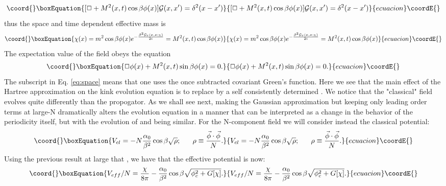 \documentclass[a4paper,prd,preprint,superscriptaddress,showpacs,byrevtex]{revtex4}
\begin{document}
\begin{equation}\coord{}\boxEquation{
[\Box + M^2(x,t) \cos \beta \phi(x)] {\cal G}(x,x') = \delta^2 (x-x')
}{
[\Box + M^2(x,t) \cos \beta \phi(x)] {\cal G}(x,x') = \delta^2 (x-x')
}{ecuacion}\coordE{}\end{equation} thus the space and time dependent effective mass is
\begin{equation}\coord{}\boxEquation{
\chi(x) = m^2 \cos \beta \phi(x) e^{-\frac{\beta^2 {\cal G}_r(x,x;\chi)}{2i}} = M^2
(x,t) \cos \beta \phi(x) \label{eq:space}}{
\chi(x) = m^2 \cos \beta \phi(x) e^{-\frac{\beta^2 {\cal G}_r(x,x;\chi)}{2i}} = M^2
(x,t) \cos \beta \phi(x) }{ecuacion}\coordE{}\end{equation}
The expectation value of the field obeys the equation
\begin{equation}\coord{}\boxEquation{
\Box \phi(x)  + M^2(x,t) \sin \beta \phi(x)       =0.
}{
\Box \phi(x)  + M^2(x,t) \sin \beta \phi(x)       =0.
}{ecuacion}\coordE{}\end{equation}
The subscript \coordHE{} in Eq. \ref{eq:space} means that one uses the once
subtracted covariant Green's function. Here we see that the main effect of the Hartree approximation on the
kink evolution equation is to replace \coordHE{} by a self consistently determined
\coordHE{}. We notice that the "classical" field evolves quite differently
than the propogator.  As we shall
see next, making the Gaussian approximation but keeping
only leading order terms at large-N dramatically alters the evolution
equation
in a manner that can be interpreted as a change in the behavior of the
periodicity itself, but with the
evolution of \myHighlight{$\phi$}\coordHE{} and \coordHE{} being similar. 
For the N-component field we will consider instead the classical potential:
\begin{equation}\coord{}\boxEquation{
V_{cl} = -N \frac {\alpha_0} {\beta^2} \cos \beta \sqrt{\rho};  ~~~~~\rho
\equiv \frac{\vec \phi \cdot \vec \phi} {N}.
}{
V_{cl} = -N \frac {\alpha_0} {\beta^2} \cos \beta \sqrt{\rho};  ~~~~~\rho
\equiv \frac{\vec \phi \cdot \vec \phi} {N}.
}{ecuacion}\coordE{}\end{equation}
Using the previous result at large \coordHE{} that \coordHE{},
we have that the effective potential is now:
\begin{equation}\coord{}\boxEquation{
V_{eff}/N  = \frac{\chi}{8 \pi} - \frac {\alpha_0} {\beta^2} \cos \beta
\sqrt{\phi_c^2 + G[\chi]}.
}{
V_{eff}/N  = \frac{\chi}{8 \pi} - \frac {\alpha_0} {\beta^2} \cos \beta
\sqrt{\phi_c^2 + G[\chi]}.
}{ecuacion}\coordE{}\end{equation}
\end{document}
